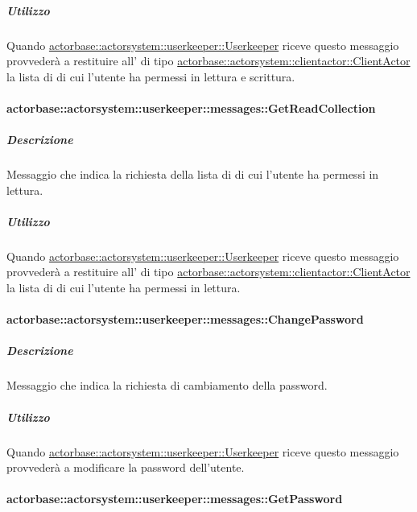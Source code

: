 \documentclass{scalatekids-article}
\begin{document}
\subparagraph{Utilizzo}

Quando \hyperref[sec:actorbase::actorsystem::userkeeper::Userkeeper]{actorbase::\allowbreak{}actorsystem::\allowbreak{}userkeeper::\allowbreak{}Userkeeper}
riceve questo messaggio provvederà a restituire all' di tipo
\hyperref[sec:actorbase::actorsystem::clientactor::ClientActor]{actorbase::\allowbreak{}actorsystem::\allowbreak{}clientactor::\allowbreak{}ClientActor}
la lista di  di cui l'utente ha permessi in lettura
e scrittura.

\paragraph{actorbase::actorsystem::userkeeper::messages::GetReadCollection}
\label{sec:actorbase::actorsystem::userkeeper::messages::GetReadCollection}

\subparagraph{Descrizione}

Messaggio che indica la richiesta della lista di  di cui
l'utente ha  permessi in lettura.

\subparagraph{Utilizzo}

Quando \hyperref[sec:actorbase::actorsystem::userkeeper::Userkeeper]{actorbase::\allowbreak{}actorsystem::\allowbreak{}userkeeper::\allowbreak{}Userkeeper}
riceve questo messaggio provvederà a restituire all' di tipo
\hyperref[sec:actorbase::actorsystem::clientactor::ClientActor]{actorbase::\allowbreak{}actorsystem::\allowbreak{}clientactor::\allowbreak{}ClientActor}
la lista di  di cui l'utente ha permessi in lettura.

\paragraph{actorbase::actorsystem::userkeeper::messages::ChangePassword}
\label{sec:actorbase::actorsystem::userkeeper::messages::ChangePassword}

\subparagraph{Descrizione}

Messaggio che indica la richiesta di cambiamento della password.

\subparagraph{Utilizzo}

Quando \hyperref[sec:actorbase::actorsystem::userkeeper::Userkeeper]{actorbase::\allowbreak{}actorsystem::\allowbreak{}userkeeper::\allowbreak{}Userkeeper}
riceve questo messaggio provvederà a modificare la password dell'utente.

\paragraph{actorbase::actorsystem::userkeeper::messages::GetPassword}
\label{sec:actorbase::actorsystem::userkeeper::messages::GetPassword}
\end{document}

